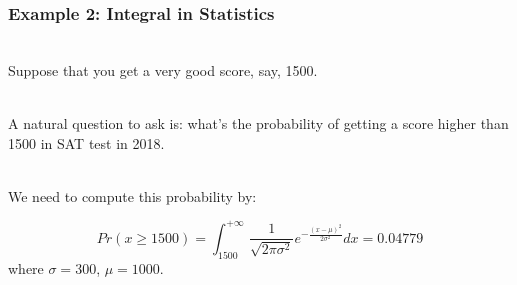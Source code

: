 \documentclass{beamer}
\numberwithin{equation}{section}
\begin{document}
\begin{frame}
\frametitle{Example 2: Integral in Statistics }

\ \\Suppose that you get a very good score, say, 1500. \pause

\ \\A natural question to ask is: what's the probability of getting a score higher than 1500 in SAT test in 2018.

\ \\We need to compute this probability by: \pause

$$Pr(x \geq 1500) = \int_{1500}^{+ \infty} {\frac {1}{\sqrt {2\pi \sigma ^{2}}}}e^{-{\frac {(x-\mu )^{2}}{2\sigma ^{2}}}} dx = 0.04779$$
where $\sigma = 300$, $\mu = 1000$.

\end{frame}
\end{document}
